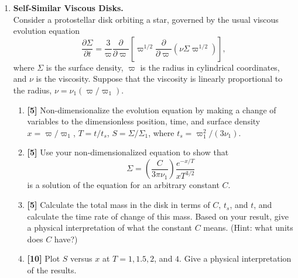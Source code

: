 \documentclass{article}
\begin{document}
\begin{enumerate}
\item \textbf{Self-Similar Viscous Disks.}\\
Consider a protostellar disk orbiting a star, governed by the usual viscous evolution equation
\begin{displaymath}
\frac{\partial\Sigma}{\partial t} = \frac{3}{\varpi} \frac{\partial}{\partial \varpi} \left[\varpi^{1/2} \frac{\partial}{\partial \varpi} \left(\nu \Sigma \varpi^{1/2}\right)\right],
\end{displaymath}
where $\Sigma$ is the surface density, $\varpi$ is the radius in cylindrical coordinates, and $\nu$ is the viscosity. Suppose that the viscosity is linearly proportional to the radius, $\nu = \nu_1 (\varpi/\varpi_1)$.
\begin{enumerate}
\item \textbf{[5]} Non-dimensionalize the evolution equation by making a change of variables to the dimensionless position, time, and surface density $x=\varpi/\varpi_1$, $T = t/t_s$, $S = \Sigma/\Sigma_1$, where $t_s = \varpi_1^2/(3\nu_1)$.
\item \textbf{[5]} Use your non-dimensionalized equation to show that
\begin{displaymath}
\Sigma = \left(\frac{C}{3\pi \nu_1}\right) \frac{e^{-x/T}}{x T^{3/2}}
\end{displaymath}
is a solution of the equation for an arbitrary constant $C$.
\item \textbf{[5]} Calculate the total mass in the disk in terms of $C$, $t_s$, and $t$, and calculate the time rate of change of this mass. Based on your result, give a physical interpretation of what the constant $C$ means. (Hint: what units does $C$ have?)
\item \textbf{[10]} Plot $S$ versus $x$ at $T = 1, 1.5, 2$, and $4$. Give a physical interpretation of the results.\\
\end{enumerate}








\end{enumerate}
\end{document}
